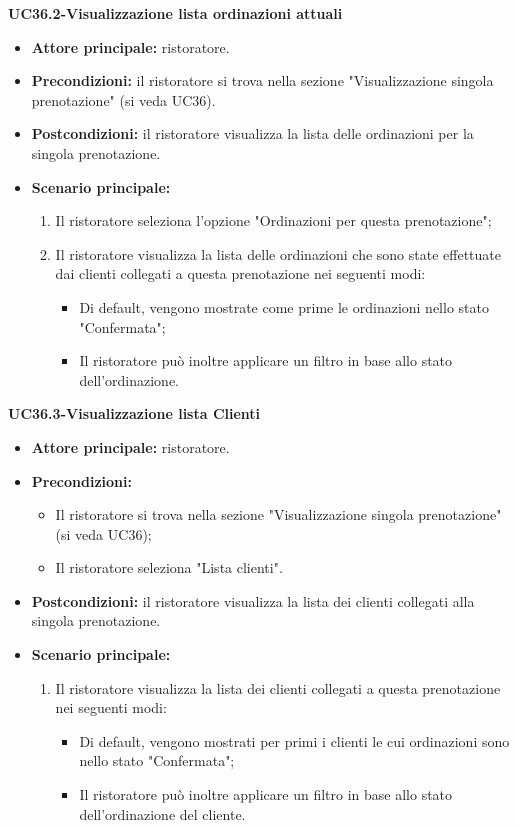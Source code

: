 \textbf{UC36.2-Visualizzazione lista ordinazioni attuali}
\begin{itemize}
    \item \textbf{Attore principale:} ristoratore.
    \item \textbf{Precondizioni:} il ristoratore si trova nella sezione "Visualizzazione singola prenotazione" (si veda UC36).
    \item \textbf{Postcondizioni:} il ristoratore visualizza la lista delle ordinazioni per la singola prenotazione.
    \item \textbf{Scenario principale:}
    \begin{enumerate}
        \item Il ristoratore seleziona l'opzione "Ordinazioni per questa prenotazione";
        \item Il ristoratore visualizza la lista delle ordinazioni che sono state effettuate dai clienti collegati a questa prenotazione nei seguenti modi:
        \begin{itemize}
            \item Di default, vengono mostrate come prime le ordinazioni nello stato "Confermata";
            \item Il ristoratore può inoltre applicare un filtro in base allo stato dell'ordinazione.
        \end{itemize}
    \end{enumerate}
\end{itemize}

\textbf{UC36.3-Visualizzazione lista Clienti}  
\begin{itemize}
    \item \textbf{Attore principale:} ristoratore.
    \item \textbf{Precondizioni:} 
    \begin{itemize}
        \item Il ristoratore si trova nella sezione "Visualizzazione singola prenotazione" (si veda UC36);
        \item Il ristoratore seleziona "Lista clienti".
    \end{itemize}
    \item \textbf{Postcondizioni:} il ristoratore visualizza la lista dei clienti collegati alla singola prenotazione.
    \item \textbf{Scenario principale:}
    \begin{enumerate}
        \item Il ristoratore visualizza la lista dei clienti collegati a questa prenotazione nei seguenti modi:
        \begin{itemize}
            \item Di default, vengono mostrati per primi i clienti le cui ordinazioni sono nello stato "Confermata";
            \item Il ristoratore può inoltre applicare un filtro in base allo stato dell'ordinazione del cliente.
        \end{itemize}
    \end{enumerate}
\end{itemize}


